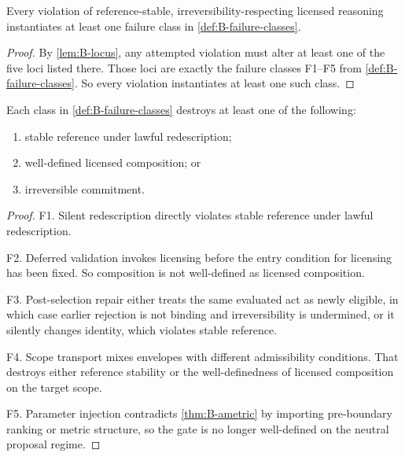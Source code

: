 \begin{theorem}
\label{thm:B-failure-exhaustion}
Every violation of reference-stable, irreversibility-respecting licensed reasoning instantiates at least one failure class in \cref{def:B-failure-classes}.
\end{theorem}

\begin{proof}
By \cref{lem:B-locus}, any attempted violation must alter at least one of the five loci listed there. Those loci are exactly the failure classes F1--F5 from \cref{def:B-failure-classes}. So every violation instantiates at least one such class.
\end{proof}

\begin{theorem}
\label{thm:B-failure-collapse}
Each class in \cref{def:B-failure-classes} destroys at least one of the following:
\begin{enumerate}[label=(\alph*), leftmargin=2.5em]
    \item stable reference under lawful redescription;
    \item well-defined licensed composition; or
    \item irreversible commitment.
\end{enumerate}
\end{theorem}

\begin{proof}
F1. Silent redescription directly violates stable reference under lawful redescription.

F2. Deferred validation invokes licensing before the entry condition for licensing has been fixed. So composition is not well-defined as licensed composition.

F3. Post-selection repair either treats the same evaluated act as newly eligible, in which case earlier rejection is not binding and irreversibility is undermined, or it silently changes identity, which violates stable reference.

F4. Scope transport mixes envelopes with different admissibility conditions. That destroys either reference stability or the well-definedness of licensed composition on the target scope.

F5. Parameter injection contradicts \cref{thm:B-ametric} by importing pre-boundary ranking or metric structure, so the gate is no longer well-defined on the neutral proposal regime.
\end{proof}

